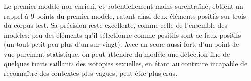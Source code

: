 Le premier modèle non enrichi, et potentiellement moins surentraîné, obtient un rappel à 9 points du premier modèle, ratant ainsi deux éléments positifs sur trois du corpus test. Sa précision reste excellente, comme celle de l'ensemble des modèles: peu des éléments qu'il sélectionne comme positifs sont de faux positifs (un tout petit peu plus d'un sur vingt). Avec un score aussi fort, d'un point de vue purement statistique, on peut attendre du modèle une détection fine de quelques traits saillants des isotopies sexuelles, en étant au contraire incapable de reconnaître des contextes plus vagues, peut-être plus crus. 

\noindent\begin{minipage}{\linewidth}%
    \resizebox{\linewidth}{!}{%
    \begin{tabular}{r|lllll|rrr}
    \toprule
     Index & Morphologie & Encodeur & Enrichissement & Embeddings & Taille encodée &  Précision &  Rappel &  Score F1 \\
    \midrule
        19 &             &  MeanMax &         Linear &       BERT &            256 &      90,20 &   \textbf{42,05} &     \textbf{57,36} \\
        18 &             &      GRU &         Linear &       BERT &            256 &      92,17 &   36,49 &     52,28 \\
        17 &             &     LSTM &           LSTM &   FastText &            256 &      96,56 &   35,08 &     51,34 \\
        16 &             &      HAN &         Linear &   Word2Vec &            128 &      96,17 &   33,79 &     49,98 \\
        15 &             &     LSTM &           LSTM &   FastText &            128 &      \textbf{97,32} &   33,23 &     49,56 \\
        14 &  Agglomérée &      GRU &                &   Word2Vec &            256 &      94,87 &   \textbf{33,11} &     \textbf{49,05} \\
        13 &  Agglomérée &     LSTM &                &   Word2Vec &            256 &      95,36 &   32,77 &     48,71 \\
        12 &  Agglomérée &     LSTM &           LSTM &   Word2Vec &            128 &      95,01 &   30,31 &     45,91 \\
        11 &             &      HAN &         Linear &       BERT &            256 &      94,27 &   30,09 &     45,61 \\
        10 &  Agglomérée &      HAN &                &   Word2Vec &            256 &      95,98 &   29,39 &     45,02 \\

\end{tabular}}
\end{minipage}
